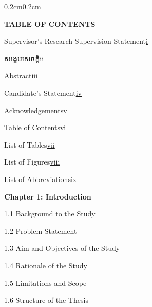 {\englishfont 
\begin{adjustwidth}{0.2cm}{0.2cm}
\englishfont\fontsize{13.5pt}{17pt}\selectfont 
    \begin{center}
        {\englishfont\fontsize{14pt}{21pt}\selectfont \textbf{TABLE OF CONTENTS} \par}
    \end{center}
    \label{toc}

    \vspace{0.6cm}
    \setlength{\parindent}{0pt}
    { Supervisor's Research Supervision Statement\dotfill\hyperref[supervisor-statement]{i}\par}
    {\khmernormal\fontsize{11pt}{16pt}\selectfont សង្ខេបសេចក្ដី\dotfill\hyperref[khmer-abstract]{ii}\par}
    { Abstract\dotfill\hyperref[abstract]{iii}\par}
    { Candidate's Statement\dotfill\hyperref[candidate-statement]{iv}\par}
    { Acknowledgements\dotfill\hyperref[acknowledgements]{v}\par}
    { Table of Contents\dotfill\hyperref[toc]{vi}\par}
    { List of Tables\dotfill\hyperref[lot]{vii}\par}
    { List of Figures\dotfill\hyperref[lof]{viii}\par}
    { List of Abbreviations\dotfill\hyperref[loa]{ix}\par}

    \vspace{0.5cm}
    { \textbf{Chapter 1: Introduction}\dotfill\pageref{ch:intro}\par}
    { \hspace{0.5cm} 1.1 Background to the Study\dotfill\pageref{sec:background}\par}
    { \hspace{0.5cm} 1.2 Problem Statement\dotfill\pageref{sec:problem}\par}
    { \hspace{0.5cm} 1.3 Aim and Objectives of the Study\dotfill\pageref{sec:objectives}\par}
    { \hspace{0.5cm} 1.4 Rationale of the Study\dotfill\pageref{sec:rationale}\par}
    { \hspace{0.5cm} 1.5 Limitations and Scope\dotfill\pageref{sec:limitations}\par}
    { \hspace{0.5cm} 1.6 Structure of the Thesis\dotfill\pageref{sec:structure}\par}


\end{adjustwidth}}
